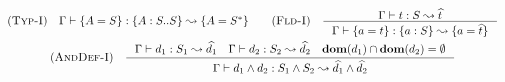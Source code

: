 \begin{minipage}{\textwidth} \[\begin{array}{c}
    \RULE{Typ-I} \quad
        \TJ{\Gamma}{\DEF{A}{S}}{\TDEC{A}{S}{S}}{\DEF{A}{\TRANS{S}}}
    \qquad

    \RULE{Fld-I} \quad \inference{
        \TJ{\Gamma}{t}{S}{\HAT{t}}
    }{
        \TJ{\Gamma}{\DEF{a}{t}}{\FDEC{a}{S}}{\DEF{a}{\HAT{t}}}
    } \\[4mm]

    \RULE{AndDef-I} \quad \inference{
        \TJ{\Gamma}{d_1}{S_1}{\HAT{d_1}} \quad
        \TJ{\Gamma}{d_2}{S_2}{\HAT{d_2}} \quad
        \DOM{d_1} \cap \DOM{d_2} = \emptyset
    }{
        \TJ{\Gamma}{\AGG{d_1}{d_2}}{\AGG{S_1}{S_2}}{\AGG{\HAT{d_1}}{\HAT{d_2}}}
    }
\end{array}\] \end{minipage}
